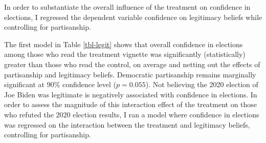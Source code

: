 \documentclass[
  12pt,
  letterpaper,
]{article}
\begin{document}
In order to substantiate the overall influence of the treatment on
confidence in elections, I regressed the dependent variable confidence
on legitimacy beliefs while controlling for partisanship.

\begin{table}[H]

\caption{\label{tbl-legit}Confidence in Elections by Treatment and
Legitimacy Beliefs}


\end{table}%

The first model in Table \ref{tbl-legit} shows that overall confidence
in elections among those who read the treatment vignette was
significantly (statistically) greater than those who read the control,
on average and netting out the effects of partisanship and legitimacy
beliefs. Democratic partisanship remains marginally significant at
\(90\%\) confidence level (\(p = 0.055\)). Not believing the 2020
election of Joe Biden was legitimate is negatively associated with
confidence in elections. In order to assess the magnitude of this
interaction effect of the treatment on those who refuted the 2020
election results, I ran a model where confidence in elections was
regressed on the interaction between the treatment and legitimacy
beliefs, controlling for partisanship.
\end{document}
